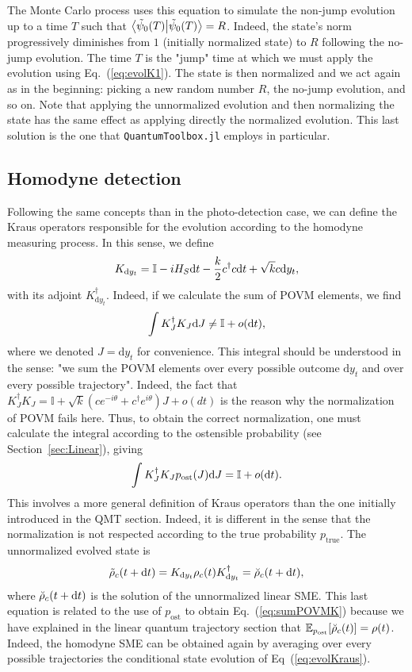The Monte Carlo process uses this equation to simulate the non-jump evolution up to a time $T$ such that $\braket{\tilde{\psi}_0(T)}=R$. Indeed, the state's norm progressively diminishes from $1$ (initially normalized state) to $R$ following the no-jump evolution. The time $T$ is the "jump" time at which we must apply the evolution using Eq.~(\ref{eq:evolK1}). The state is then normalized and we act again as in the beginning: picking a new random number $R$, the no-jump evolution, and so on. Note that applying the unnormalized evolution and then normalizing the state has the same effect as applying directly the normalized evolution. This last solution is the one that \verb|QuantumToolbox.jl| employs in particular. 

\subsection{Homodyne detection}
Following the same concepts than in the photo-detection case, we can define the Kraus operators responsible for the evolution according to the homodyne measuring process. In this sense, we define
\begin{equation}
    K_{\mathrm{d}y_t} = \mathbb{I} - iH_S\mathrm{d}t - \frac{k}{2}c^\dagger c\mathrm{d}t + \sqrt{k}c\mathrm{d}y_t,
\end{equation}
with its adjoint $K^\dagger_{\mathrm{d}y_t}$. Indeed, if we calculate the sum of POVM elements, we find
\begin{equation}
    \int K_J^\dagger K_J \mathrm{d}J \neq \mathbb{I}+o(\mathrm{d}t),
\end{equation}
where we denoted $J=\mathrm{d}y_t$ for convenience. This integral should be understood in the sense: "we sum the POVM elements over every possible outcome $\mathrm{d}y_t$ and over every possible trajectory". Indeed, the fact that $K_J^\dagger K_J = \mathbb{I}+\sqrt{k}(ce^{-i\theta}+c^\dagger e^{i\theta})J+o(dt)$ is the reason why the normalization of POVM fails here. Thus, to obtain the correct normalization, one must calculate the integral according to the ostensible probability (see Section~\ref{sec:Linear}), giving
\begin{equation}\label{eq:sumPOVMK}
    \int K_J^\dagger K_J p_\mathrm{ost}(J)\mathrm{d}J = \mathbb{I}+o(\mathrm{d}t).
\end{equation}
This involves a more general definition of Kraus operators than the one initially introduced in the QMT section. Indeed, it is different in the sense that the normalization is not respected according to the true probability $p_\mathrm{true}$. The unnormalized evolved state is 
\begin{equation}\label{eq:evolKraus}
    \tilde{\rho}_c(t+\mathrm{d}t) = K_{\mathrm{d}y_t}\rho_c(t)K^\dagger_{\mathrm{d}y_t} = \breve{\rho}_c(t+\mathrm{d}t),
\end{equation}
where $\breve{\rho}_c(t+\mathrm{d}t)$ is the solution of the unnormalized linear SME. This last equation is related to the use of $p_\mathrm{ost}$ to obtain Eq.~(\ref{eq:sumPOVMK}) because we have explained in the linear quantum trajectory section that $\mathbb{E}_{p_\text{ost}}\qty[\breve{\rho}_c(t)]=\rho(t)$. Indeed, the homodyne SME can be obtained again by averaging over every possible trajectories the conditional state evolution of Eq~(\ref{eq:evolKraus}).

